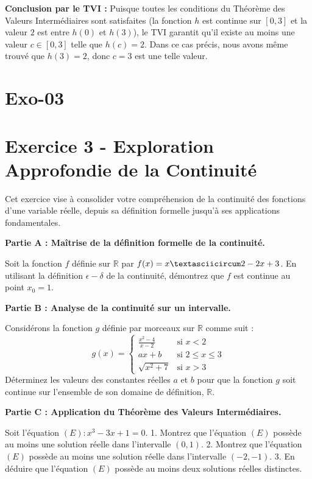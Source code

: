 \documentclass[12pt,a4paper]{report}
\begin{document}
\textbf{Conclusion par le TVI :}
Puisque toutes les conditions du Théorème des Valeurs Intermédiaires sont satisfaites (la fonction $h$ est continue sur $[0, 3]$ et la valeur $2$ est entre $h(0)$ et $h(3)$), le TVI garantit qu'il existe au moins une valeur $c \in [0, 3]$ telle que $h(c) = 2$.
Dans ce cas précis, nous avons même trouvé que $h(3) = 2$, donc $c=3$ est une telle valeur.

\section{Exo-03}
\section{Exercice 3 - Exploration Approfondie de la Continuité}

Cet exercice vise à consolider votre compréhension de la continuité des fonctions d'une variable réelle, depuis sa définition formelle jusqu'à ses applications fondamentales.

\textbf{Partie A : Maîtrise de la définition formelle de la continuité.}

Soit la fonction $f$ définie sur $\mathbb{R}$ par $f(x) = x\textasciicircum 2 - 2x + 3$.
En utilisant la définition $\epsilon-\delta$ de la continuité, démontrez que $f$ est continue au point $x_0 = 1$.

\textbf{Partie B : Analyse de la continuité sur un intervalle.}

Considérons la fonction $g$ définie par morceaux sur $\mathbb{R}$ comme suit :
$$ g(x) = \begin{cases} \frac{x^2 - 4}{x - 2} & \text{si } x < 2 \\ ax + b & \text{si } 2 \le x \le 3 \\ \sqrt{x^2 + 7} & \text{si } x > 3 \end{cases} $$
Déterminez les valeurs des constantes réelles $a$ et $b$ pour que la fonction $g$ soit continue sur l'ensemble de son domaine de définition, $\mathbb{R}$.

\textbf{Partie C : Application du Théorème des Valeurs Intermédiaires.}

Soit l'équation $(E) : x^3 - 3x + 1 = 0$.
1.  Montrez que l'équation $(E)$ possède au moins une solution réelle dans l'intervalle $(0, 1)$.
2.  Montrez que l'équation $(E)$ possède au moins une solution réelle dans l'intervalle $(-2, -1)$.
3.  En déduire que l'équation $(E)$ possède au moins deux solutions réelles distinctes.
\end{document}
